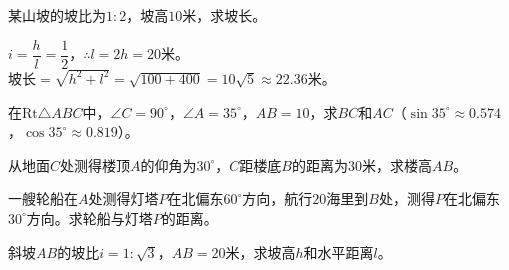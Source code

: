 \documentclass[a4paper,12pt]{ctexart}
\begin{document}
\newpage






\begin{example}
某山坡的坡比为$1:2$，坡高$10$米，求坡长。
\end{example}
\begin{solution}
$i=\dfrac{h}{l}=\dfrac12$，$\therefore l=2h=20$米。\\
坡长$=\sqrt{h^2+l^2}=\sqrt{100+400}=10\sqrt5\approx22.36$米。
\end{solution}


\begin{exercise}
\item 在$\text{Rt}\triangle ABC$中，$\angle C=90^\circ$，$\angle A=35^\circ$，$AB=10$，求$BC$和$AC$（$\sin35^\circ\approx0.574$，$\cos35^\circ\approx0.819$）。
\item 从地面$C$处测得楼顶$A$的仰角为$30^\circ$，$C$距楼底$B$的距离为$30$米，求楼高$AB$。
\item 一艘轮船在$A$处测得灯塔$P$在北偏东$60^\circ$方向，航行$20$海里到$B$处，测得$P$在北偏东$30^\circ$方向。求轮船与灯塔$P$的距离。
\item 斜坡$AB$的坡比$i=1:\sqrt3$，$AB=20$米，求坡高$h$和水平距离$l$。
\end{exercise}

\newpage



\end{document}
